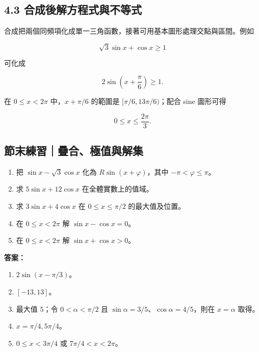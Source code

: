 \documentclass[11pt,a4paper]{article}
\providecommand{\tightlist}{%
  \setlength{\itemsep}{0pt}\setlength{\parskip}{0pt}}
\begin{document}
\subsection{4.3 合成後解方程式與不等式}\label{ux5408ux6210ux5f8cux89e3ux65b9ux7a0bux5f0fux8207ux4e0dux7b49ux5f0f}

合成把兩個同頻項化成單一三角函數，接著可用基本圖形處理交點與區間。例如

\[
\sqrt3\sin x+\cos x\ge1
\]

可化成

\[
2\sin\left(x+\frac\pi6\right)\ge1.
\]

在 \(0\le x<2\pi\) 中，\(x+\pi/6\) 的範圍是 \([\pi/6,13\pi/6)\)；配合 sine 圖形可得

\[
\boxed{0\le x\le\frac{2\pi}{3}}.
\]

\begin{HandoutSelfCheck}

\subsection{節末練習｜疊合、極值與解集}\label{ux7bc0ux672bux7df4ux7fd2ux758aux5408ux6975ux503cux8207ux89e3ux96c6}

\begin{enumerate}
\def\labelenumi{\arabic{enumi}.}
\tightlist
\item
  把 \(\sin x-\sqrt3\cos x\) 化為 \(R\sin(x+\varphi)\)，其中 \(-\pi<\varphi\le\pi\)。
\item
  求 \(5\sin x+12\cos x\) 在全體實數上的值域。
\item
  求 \(3\sin x+4\cos x\) 在 \(0\le x\le\pi/2\) 的最大值及位置。
\item
  在 \(0\le x<2\pi\) 解 \(\sin x-\cos x=0\)。
\item
  在 \(0\le x<2\pi\) 解 \(\sin x+\cos x>0\)。
\end{enumerate}

\textbf{答案：}

\begin{enumerate}
\def\labelenumi{\arabic{enumi}.}
\tightlist
\item
  \(2\sin(x-\pi/3)\)。
\item
  \([-13,13]\)。
\item
  最大值 \(5\)；令 \(0<\alpha<\pi/2\) 且 \(\sin\alpha=3/5\)、\(\cos\alpha=4/5\)，則在 \(x=\alpha\) 取得。
\item
  \(x=\pi/4,5\pi/4\)。
\item
  \(0\le x<3\pi/4\) 或 \(7\pi/4<x<2\pi\)。
\end{enumerate}

\end{HandoutSelfCheck}
\end{document}
